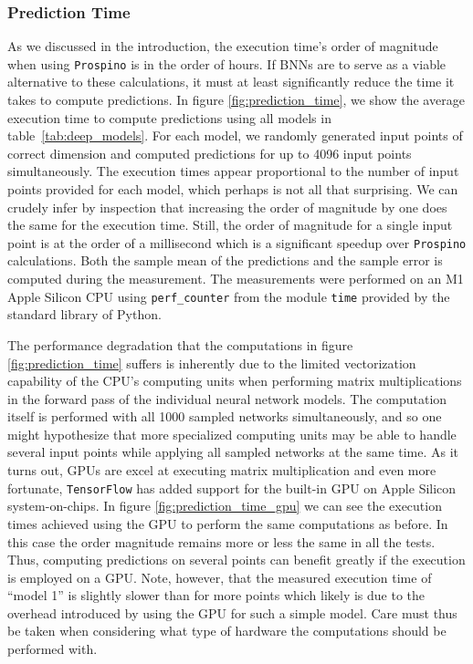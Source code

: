 \subsubsection{Prediction Time}
As we discussed in the introduction, the execution time's order of magnitude when using {\tt Prospino} is in the order of hours. 
If BNNs are to serve as a viable alternative to these calculations, it must at least significantly reduce the time it takes to compute predictions. In figure \ref{fig:prediction_time}, we 
show the average execution time to compute predictions using all models in table~\ref{tab:deep_models}.
For each model, we randomly generated input points of correct dimension and computed predictions for up to 4096 input points simultaneously.
The execution times appear proportional to the number of input points provided for each model, which perhaps is not all that surprising. We can crudely infer by inspection that increasing the order of magnitude by one does the same for the execution time. Still, the order of magnitude for a single input point is at the order of a millisecond which is a significant speedup over {\tt Prospino} calculations. Both the sample mean of the predictions and the sample error is computed during the measurement. The measurements were performed on an M1 Apple Silicon CPU using {\tt perf\_counter} from the module {\tt time} provided by the standard library of Python.

The performance degradation that the computations in figure \ref{fig:prediction_time} suffers is inherently due to the limited vectorization capability of the CPU's computing units when performing matrix multiplications in the forward pass of the individual neural network models. The computation itself is performed with all 1000 sampled networks simultaneously, and so one might hypothesize that more specialized computing units may be able to handle several input points while applying all sampled networks at the same time. As it turns out, GPUs are excel at executing matrix multiplication and even more fortunate, {\tt TensorFlow} has added support for the built-in GPU on Apple Silicon system-on-chips. In figure \ref{fig:prediction_time_gpu} we can see the execution times achieved using the GPU to perform the same computations as before. In this case the order magnitude remains more or less the same in all the tests. Thus, computing predictions on several points can benefit greatly if the execution is employed on a GPU. Note, however, that the measured execution time of ``model 1'' is slightly slower than for more points which likely is due to the overhead introduced by using the GPU for such a simple model. Care must thus be taken when considering what type of hardware the computations should be performed with.


